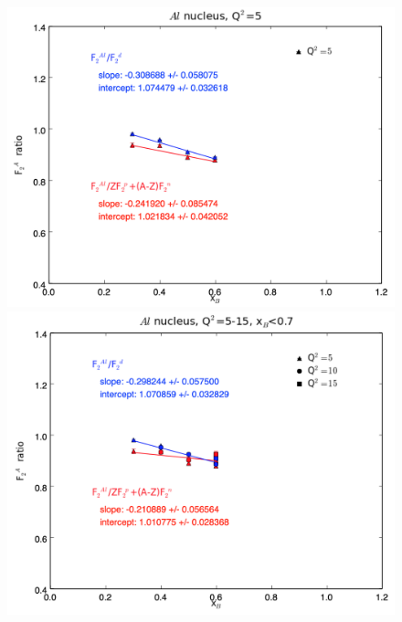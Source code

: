 \documentclass[oneside]{article}
\begin{document}
 \begin{figure}[H]
\begin{minipage}{0.5\textwidth}
 \includegraphics[width=\textwidth]{plots/q2_5/q2_5_Al.png}
\end{minipage}\hfill\begin{minipage}{0.5\textwidth}
\includegraphics[width=\textwidth]{plots/q2_all_x_l7/q2_all_x_l7_Al.png}
\end{minipage}\hfill\begin{minipage}{0.5\textwidth}

\end{minipage}
\end{figure}
\end{document}
